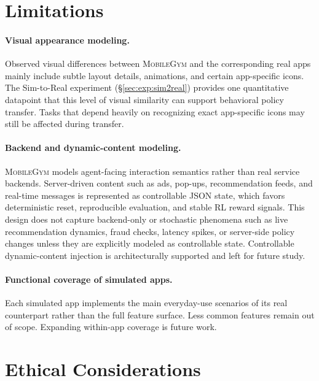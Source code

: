 \documentclass{llmxive}
\providecommand{\sys}{\textsc{MobileGym}}
\begin{document}
\section*{Limitations}

\paragraph{Visual appearance modeling.} Observed visual differences between \sys{} and the corresponding real apps mainly include subtle layout details, animations, and certain app-specific icons. The Sim-to-Real experiment (§\ref{sec:exp:sim2real}) provides one quantitative datapoint that this level of visual similarity can support behavioral policy transfer. Tasks that depend heavily on recognizing exact app-specific icons may still be affected during transfer.

\paragraph{Backend and dynamic-content modeling.} \sys{} models agent-facing interaction semantics rather than real service backends. Server-driven content such as ads, pop-ups, recommendation feeds, and real-time messages is represented as controllable JSON state, which favors deterministic reset, reproducible evaluation, and stable RL reward signals. This design does not capture backend-only or stochastic phenomena such as live recommendation dynamics, fraud checks, latency spikes, or server-side policy changes unless they are explicitly modeled as controllable state. Controllable dynamic-content injection is architecturally supported and left for future study.

\paragraph{Functional coverage of simulated apps.} Each simulated app implements the main everyday-use scenarios of its real counterpart rather than the full feature surface. Less common features remain out of scope. Expanding within-app coverage is future work.



\section*{Ethical Considerations}
\end{document}
